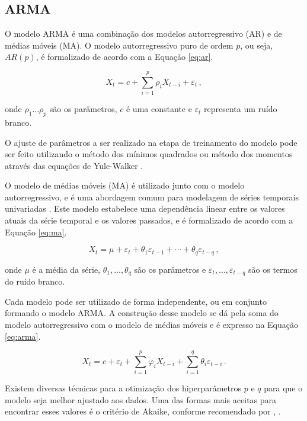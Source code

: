 \subsection{ARMA}
O modelo ARMA é uma combinação dos modelos autorregressivo (AR) e de médias móveis (MA). O modelo autorregressivo puro de ordem $p$, ou seja, $AR(p)$, é formalizado de acordo com a Equação \eqref{eq:ar}.

\begin{equation}\label{eq:ar}
    X_{t}=c+\sum ^{p}_{i=1}\rho _{i}X_{t-i}+\varepsilon _{t}\, ,
\end{equation}

onde $\rho _{1}\ldots \rho _{p}$ são os parâmetros, $c$ é uma constante e $\varepsilon _{t}$ representa um ruído branco.

O ajuste de parâmetros a ser realizado na etapa de treinamento do modelo pode ser feito utilizando o método dos mínimos quadrados ou método dos momentos através das equações de Yule-Walker \cite{box&jenkins}.

O modelo de médias móveis (MA) é utilizado junto com o modelo autorregressivo, e é uma abordagem comum para modelagem de séries temporais univariadas \cite{box&jenkins}. Este modelo estabelece uma dependência linear entre os valores atuais da série temporal e os valores passados, e é formalizado de acordo com a Equação \eqref{eq:ma}.

\begin{equation}\label{eq:ma}
    X_{t}=\mu+\varepsilon_{t}+\theta_{1} \varepsilon_{t-1}+\cdots+\theta_{q} \varepsilon_{t-q}\, ,
\end{equation}

onde $\mu$ é a média da série, $\theta_{1}, ..., \theta_{q}$ são os parâmetros e $\varepsilon_{t}, ..., \varepsilon_{t-q}$ são os termos do ruído branco.

Cada modelo pode ser utilizado de forma independente, ou em conjunto formando o modelo ARMA. A construção desse modelo se dá pela soma do modelo autorregressivo com o modelo de médias móveis e é expresso na Equação \eqref{eq:arma}.

\begin{equation}\label{eq:arma}
    X_{t}=c+\varepsilon_{t}+\sum_{i=1}^{p} \varphi_{i} X_{t-i}+\sum_{i=1}^{q} \theta_{i} \varepsilon_{t-i}\, .
\end{equation}

Existem diversas técnicas para a otimização dos hiperparâmetros $p$ e $q$ para que o modelo seja melhor ajustado aos dados. Uma das formas mais aceitas para encontrar esses valores é o critério de Akaike, conforme recomendado por \citeauthor{akaike}, \citeyear{akaike} \cite{akaike}.


